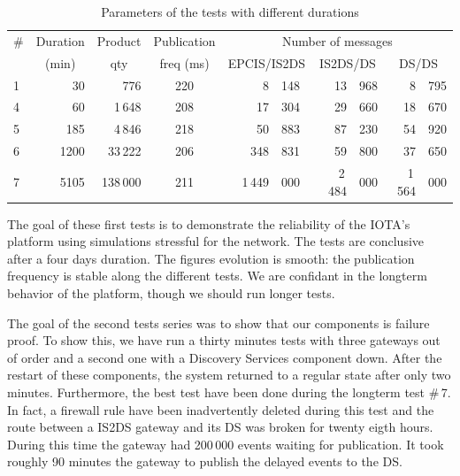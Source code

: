 \documentclass[a4paper]{llncs}
\begin{document}
\begin{table}
\begin{center}
\caption{Parameters of the tests with different durations}
\label{testDur}
\begin{tabular}{| l | r | r | c | r@{\,}l | r@{\,}l | r@{\,}l|}
 \hline
 \# &  \multicolumn{1}{c|}{Duration} & \multicolumn{1}{c|}{Product} &
 \multicolumn{1}{c|}{Publication} & \multicolumn{6}{c|}{Number of messages} \\
 \cline{5-10}
  &   \multicolumn{1}{c|}{(min)}             & \multicolumn{1}{c|}{qty} &  \multicolumn{1}{c|}{freq (ms)} & \multicolumn{2}{c|}{EPCIS/IS2DS} & \multicolumn{2}{c|}{IS2DS/DS} & \multicolumn{2}{c|}{DS/DS} \\
 \hline
 \hline
 1 & 30 & 776 & 220 & 8&148 & 13&968 & 8&795 \\
 4 & 60 & 1\,648 & 208 & 17&304 & 29&660 & 18&670 \\
 5 & 185 & 4\,846 & 218 & 50&883 & 87&230 & 54&920 \\
 6 & 1200 & 33\,222 & 206 & 348&831 & 59&800 & 37&650 \\
 7 & 5105 & 138\,000 & 211 & ~1\,449&000 & ~2\,484&000 & ~1\,564&000 \\
 \hline
\end{tabular}
\end{center}
\end{table}

The goal of these first tests is to demonstrate  the reliability of the IOTA's
platform using simulations stressful for the network. The tests are conclusive
after a four days duration. The figures evolution is smooth: the publication
frequency is stable along the different tests. 
We are confidant in the longterm behavior of the
platform, though we should run longer tests.   

The goal of the second tests series was to show that our components is failure
proof. To show this, we have run a thirty minutes tests with
three gateways out of order and a second one with a Discovery Services
component down. After the  restart of these components, the system returned to
a regular state after only two minutes. 
Furthermore, the best test have been done during the longterm test \#\,7. In
fact, a firewall rule have been inadvertently deleted during this test and the
route between a IS2DS gateway and its DS was broken for twenty eigth
hours. During this time the gateway had 200\,000 events waiting for
publication. It took roughly 90  minutes the gateway to publish the delayed
events to the DS. 
\end{document}
